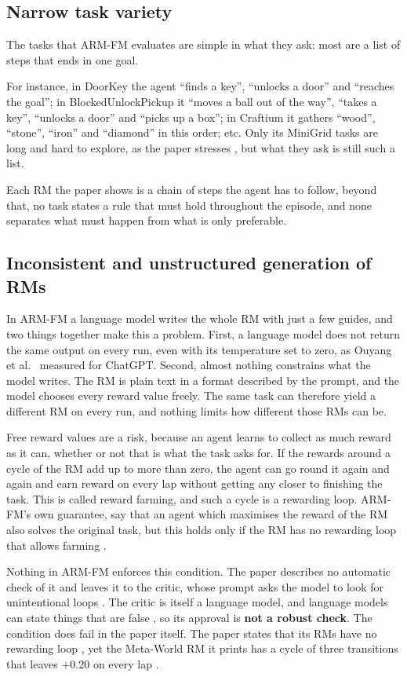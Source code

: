 \documentclass[11pt,english,listoffigures,listoftables]{tfgetsinf}
\begin{document}
\subsection{Narrow task variety}
The tasks that ARM-FM evaluates are simple in what they ask: most are a list of steps that ends in one goal. 

For instance, in DoorKey the agent ``finds a key'', ``unlocks a door'' and ``reaches the goal''; in BlockedUnlockPickup it ``moves a ball out of the way'', ``takes a key'', ``unlocks a door'' and ``picks up a box''; in Craftium it gathers ``wood'', ``stone'', ``iron'' and ``diamond'' in this order; etc. Only its MiniGrid tasks are long and hard to explore, as the paper stresses \cite[pp.~5, 14]{creus2026armfm}, but what they ask is still such a list. 

Each RM the paper shows is a chain of steps the agent has to follow, beyond that, no task states a rule that must hold throughout the episode, and none separates what must happen from what is only preferable. 

\subsection{Inconsistent and unstructured generation of RMs}
In ARM-FM a language model writes the whole RM with just a few guides, and two things together make this a problem. First, a language model does not return the same output on every run, even with its temperature set to zero, as Ouyang et al.~\cite{ouyang2025empirical} measured for ChatGPT. Second, almost nothing constrains what the model writes. The RM is plain text in a format described by the prompt, and the model chooses every reward value freely. The same task can therefore yield a different RM on every run, and nothing limits how different those RMs can be.

Free reward values are a risk, because an agent learns to collect as much reward as it can, whether or not that is what the task asks for. If the rewards around a cycle of the RM add up to more than zero, the agent can go round it again and again and earn reward on every lap without getting any closer to finishing the task. This is called reward farming, and such a cycle is a rewarding loop. ARM-FM's own guarantee, say that an agent which maximises the reward of the RM also solves the original task, but this holds only if the RM has no rewarding loop that allows farming \cite[p.~21]{creus2026armfm}. 

Nothing in ARM-FM enforces this condition. The paper describes no automatic check of it and leaves it to the critic, whose prompt asks the model to look for unintentional loops \cite[p.~27]{creus2026armfm}. The critic is itself a language model, and language models can state things that are false \cite{huang2025survey}, so its approval is \textbf{not a robust check}. The condition does fail in the paper itself. The paper states that its RMs have no rewarding loop \cite[p.~21]{creus2026armfm}, yet the Meta-World RM it prints has a cycle of three transitions that leaves $+0.20$ on every lap \cite[p.~32]{creus2026armfm}.
\end{document}
